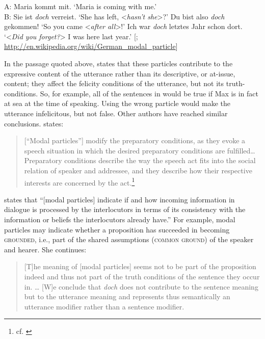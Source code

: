 \ea \label{ex:11.27} \ea  A: Maria kommt mit. ‘Maria is coming with me.’\\
    B: Sie ist \textit{doch} verreist. ‘She has left, <\textit{hasn’t she}>?’
\ex  Du bist also \textit{doch} gekommen! ‘So you came <\textit{after all}>!’
\ex Ich war \textit{doch} letztes Jahr schon dort. ‘<\textit{Did you forget?}> I was here last year.’  [\citet{Karagjosova2000}; \url{http://en.wikipedia.org/wiki/German\_modal\_particle}]
\z \z 


In the passage quoted above, \citet{Zimmermann2011} states that these particles contribute to the expressive content of the utterance rather than its descriptive, or at-issue, content; they affect the felicity conditions of the utterance, but not its truth-conditions. So, for example, all of the sentences in  would be true if Max is in fact at sea at the time of speaking. Using the wrong particle would make the utterance infelicitous, but not false. Other authors have reached similar conclusions. \citet{Waltereit2001} states:


\begin{quote}
{}[“Modal particles”] modify the preparatory conditions, as they evoke a speech situation in which the desired preparatory conditions are fulfilled… Preparatory conditions describe the way the speech act fits into the social relation of speaker and addressee, and they describe how their respective interests are concerned by the act.\footnote{cf. \citet{Searle1969}}
\end{quote}


\citet{Karagjosova2000} states that “[modal particles] indicate if and how incoming information in dialogue is processed by the interlocutors in terms of its consistency with the information or beliefs the interlocutors already have.” For example, modal particles may indicate whether a proposition has succeeded in becoming \textsc{grounded}, i.e., part of the shared assumptions (\textsc{common ground}) of the speaker and hearer. She continues:


\begin{quote}
{}[T]he meaning of [modal particles] seems not to be part of the proposition indeed and thus not part of the truth conditions of the sentence they occur in. …  [W]e conclude that \textit{doch} does not contribute to the sentence meaning but to the utterance meaning and represents thus semantically an utterance modifier rather than a sentence modifier.
\end{quote}


